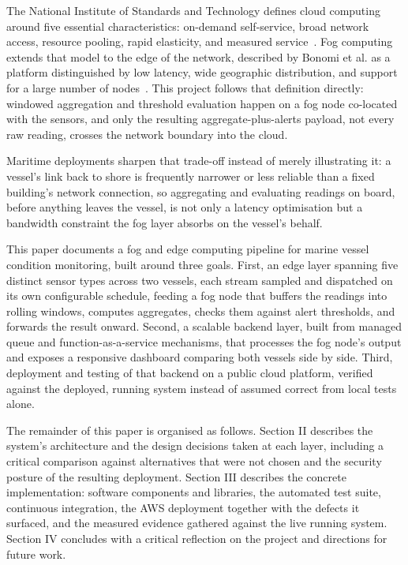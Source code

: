 \documentclass[conference]{IEEEtran}
\begin{document}
The National Institute of Standards and Technology defines cloud computing around five essential characteristics: on-demand self-service, broad network access, resource pooling, rapid elasticity, and measured service~\cite{ref2}. Fog computing extends that model to the edge of the network, described by Bonomi et al. as a platform distinguished by low latency, wide geographic distribution, and support for a large number of nodes~\cite{ref3}. This project follows that definition directly: windowed aggregation and threshold evaluation happen on a fog node co-located with the sensors, and only the resulting aggregate-plus-alerts payload, not every raw reading, crosses the network boundary into the cloud.

Maritime deployments sharpen that trade-off instead of merely illustrating it: a vessel's link back to shore is frequently narrower or less reliable than a fixed building's network connection, so aggregating and evaluating readings on board, before anything leaves the vessel, is not only a latency optimisation but a bandwidth constraint the fog layer absorbs on the vessel's behalf.

This paper documents a fog and edge computing pipeline for marine vessel condition monitoring, built around three goals. First, an edge layer spanning five distinct sensor types across two vessels, each stream sampled and dispatched on its own configurable schedule, feeding a fog node that buffers the readings into rolling windows, computes aggregates, checks them against alert thresholds, and forwards the result onward. Second, a scalable backend layer, built from managed queue and function-as-a-service mechanisms, that processes the fog node's output and exposes a responsive dashboard comparing both vessels side by side. Third, deployment and testing of that backend on a public cloud platform, verified against the deployed, running system instead of assumed correct from local tests alone.

The remainder of this paper is organised as follows. Section II describes the system's architecture and the design decisions taken at each layer, including a critical comparison against alternatives that were not chosen and the security posture of the resulting deployment. Section III describes the concrete implementation: software components and libraries, the automated test suite, continuous integration, the AWS deployment together with the defects it surfaced, and the measured evidence gathered against the live running system. Section IV concludes with a critical reflection on the project and directions for future work.
\end{document}

